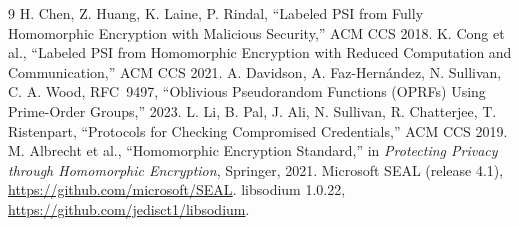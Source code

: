 \documentclass[11pt]{article}
\begin{document}
\footnotesize
\begin{thebibliography}{9}\setlength{\itemsep}{0pt}
 H. Chen, Z. Huang, K. Laine, P. Rindal, ``Labeled PSI from Fully Homomorphic Encryption with Malicious Security,'' ACM CCS 2018.
 K. Cong et al., ``Labeled PSI from Homomorphic Encryption with Reduced Computation and Communication,'' ACM CCS 2021.
 A. Davidson, A. Faz-Hern\'andez, N. Sullivan, C. A. Wood, RFC~9497, ``Oblivious Pseudorandom Functions (OPRFs) Using Prime-Order Groups,'' 2023.
 L. Li, B. Pal, J. Ali, N. Sullivan, R. Chatterjee, T. Ristenpart, ``Protocols for Checking Compromised Credentials,'' ACM CCS 2019.
 M. Albrecht et al., ``Homomorphic Encryption Standard,'' in \emph{Protecting Privacy through Homomorphic Encryption}, Springer, 2021.
 Microsoft SEAL (release 4.1), \url{https://github.com/microsoft/SEAL}.
 libsodium 1.0.22, \url{https://github.com/jedisct1/libsodium}.
\end{thebibliography}
\end{document}
